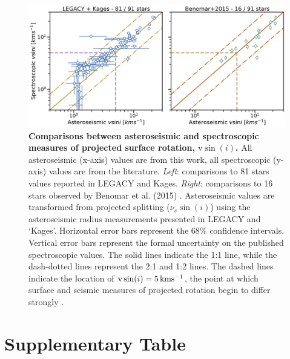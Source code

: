 \documentclass[12pt]{article}
\begin{document}
\begin{figure}[h!]
	\centering
	\includegraphics[width=\textwidth]{Images/vsini_comparison_new.jpg}
	\caption{\textbf{Comparisons between asteroseismic and spectroscopic measures of projected surface rotation, $\textrm{v}\sin(i)$.} All asteroseismic (x-axis) values are from this work, all spectroscopic (y-axis) values are from the literature. \textit{Left}: comparisons to 81 stars values reported in LEGACY and Kages. \textit{Right}: comparisons to 16 stars observed by Benomar et al. (2015) \cite{m_benomar+2015}. Asteroseismic values are transformed from projected splitting ($\nu_s\sin(i)$) using the asteroseismic radius measurements presented in LEGACY and `Kages'. Horizontal error bars represent the 68\% confidence intervals. Vertical error bars represent the formal uncertainty on the published spectroscopic values. The solid lines indicate the 1:1 line, while the dash-dotted lines represent the 2:1 and 1:2 lines. The dashed lines indicate the location of $\textrm{v}\sin(i) = 5\, \rm{kms^{-1}}$, the point at which surface and seismic measures of projected rotation begin to differ strongly \cite{m_tayar+2015}.}
	\label{fig:vsinilit}
\end{figure}

\section{Supplementary Table}

\end{document}
